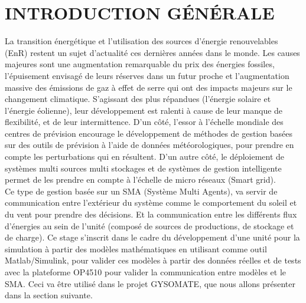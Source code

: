\chapter*{INTRODUCTION GÉNÉRALE}
La transition énergétique et l’utilisation des sources d'énergie renouvelables (EnR) restent un sujet d’actualité ces dernières années dans le monde. Les causes majeures sont une augmentation remarquable du prix des énergies fossiles, l’épuisement envisagé de leurs réserves dans un futur proche et l'augmentation massive des émissions de gaz à effet de serre qui ont des impacts majeurs sur le changement climatique. S'agissant des plus répandues (l'énergie solaire et l'énergie éolienne), leur développement est ralenti à cause de leur manque de  flexibilité, et de leur intermittence. D'un côté, l'essor à l’échelle mondiale des centres de prévision encourage le développement de méthodes de gestion basées sur des outils de prévision à l’aide de données météorologiques, pour prendre en compte les perturbations qui en résultent. D’un autre côté, le déploiement de systèmes multi sources multi stockages et de systèmes de gestion intelligente permet de les prendre en compte à l'échelle de micro réseaux (Smart grid).\\ Ce type de gestion basée sur un SMA (Système Multi Agents), va servir de communication entre l’extérieur du système comme le comportement du soleil et du vent pour prendre des décisions. Et la communication entre les différents flux d'énergies au sein de l'unité (composé de sources de productions, de stockage et de charge). Ce stage s’inscrit dans le cadre du développement d’une unité pour la simulation à partir des modèles mathématiques en utilisant comme outil Matlab/Simulink, pour valider ces modèles à partir des données réelles et de tests avec la plateforme OP4510 pour valider la communication entre modèles et le SMA. Ceci va être utilisé dans le projet GYSOMATE, que nous allons présenter dans la section suivante.

